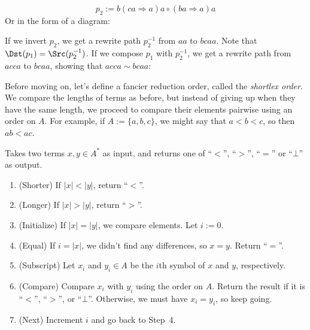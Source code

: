 \documentclass[../generics]{subfiles}
\begin{document}
\begin{example}
\[p_2 := b(ca\Rightarrow a)a\circ(ba\Rightarrow a)a\]
Or in the form of a diagram:
\begin{quote}
\end{quote}
If we invert $p_2$, we get a rewrite path $p_2^{-1}$ from $aa$ to $bcaa$. Note that $\Dst(p_1)=\Src(p_2^{-1})$. If we compose $p_1$ with $p_2^{-1}$, we get a rewrite path from $acca$ to $bcaa$, showing that $acca\sim bcaa$:
\begin{quote}
\end{quote}
\end{example}
%
%
Before moving on, let's define a fancier reduction order, called the \emph{shortlex order}. We compare the lengths of terms as before, but instead of giving up when they have the same length, we proceed to compare their elements pairwise using an order on $A$. For example, if $A:=\{a,b,c\}$, we might say that $a<b<c$, so then $ab<ac$.
%
\begin{algorithm}\label{shortlex}
Takes two terms $x,y\in A^*$ as input, and returns one of ``$<$'', ``$>$'', ``$=$'' or \index{$\bot$}``$\bot$'' as output.
\begin{enumerate}
\item (Shorter) If $|x|<|y|$, return ``$<$''.
\item (Longer) If $|x|>|y|$, return ``$>$''.
\item (Initialize) If $|x|=|y|$, we compare elements. Let $i:=0$.
\item (Equal) If $i=|x|$, we didn't find any differences, so $x=y$. Return ``$=$''.
\item (Subscript) Let $x_i$ and $y_i\in A$ be the $i$th symbol of $x$ and $y$, respectively.
\item (Compare) Compare $x_i$ with $y_i$ using the order on $A$. Return the result if it is ``$<$'', ``$>$'', or ``$\bot$''. Otherwise, we must have $x_i=y_i$, so keep going.
\item (Next) Increment $i$ and go back to Step~4.
\end{enumerate}
\end{algorithm}
\end{document}
